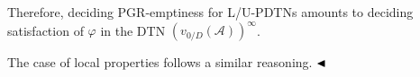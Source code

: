 \documentclass[10pt,a4paper]{article}
\begin{document}
   
Therefore, deciding PGR-emptiness for L/U-PDTNs amounts to deciding satisfaction of $\varphi$ in the DTN ${(v_{0/D}(\mathcal{A}))}^{\infty}$.\par
 
 
 
The case of local properties follows a similar reasoning. $\hfill\blacktriangleleft$\par
 
 
 
\par
 
 
 
 
\end{document}
